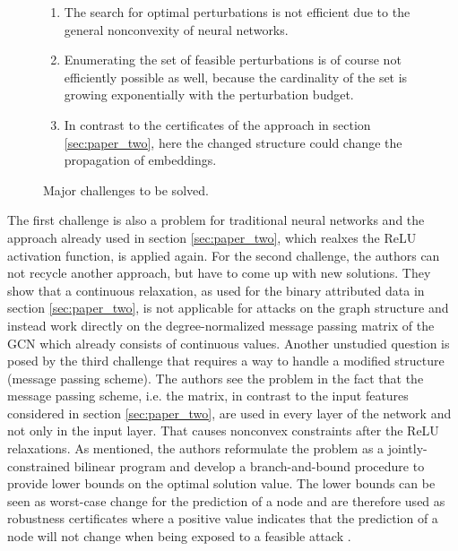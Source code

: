 \documentclass[a4paper,preprint]{sig-alternate}
\begin{document}
\begin{figure}[h]
    \centering
    \begin{enumerate}
        \item The search for optimal perturbations is not efficient due to the general nonconvexity of neural networks.
        \item Enumerating the set of feasible perturbations is of course not efficiently possible as well, because the cardinality of the
        set is growing exponentially with the perturbation budget.
        \item In contrast to the certificates of the approach in section \ref{sec:paper_two}, here the changed structure could change 
        the propagation of embeddings.
    \end{enumerate}
    \caption{Major challenges to be solved.}
    \label{fig:challenges}
\end{figure}

The first challenge is also a problem for traditional neural networks and the approach already used
in section \ref{sec:paper_two}, which realxes the ReLU activation function, is applied again. \cite{10.1145/3394486.3403217}
For the second challenge, the authors can not recycle another approach, but have to come up with new solutions.
They show that a continuous relaxation, as used for the binary attributed data in section \ref{sec:paper_two}, 
is not applicable for attacks on the graph structure and instead work directly on the degree-normalized message passing matrix 
of the GCN which already consists of continuous values.
Another unstudied question is posed by the third challenge that requires a way to handle a modified structure (message passing scheme). \cite{10.1145/3394486.3403217}
The authors see the problem in the fact that the message passing scheme, i.e. the matrix, in contrast to the input features considered
in section \ref{sec:paper_two}, are used in every layer of the network and not only in the input layer.
That causes nonconvex constraints after the ReLU relaxations. \cite{10.1145/3394486.3403217}
As mentioned, the authors reformulate the problem as a jointly-constrained bilinear program and develop a branch-and-bound procedure 
to provide lower bounds on the optimal solution value.
The lower bounds can be seen as worst-case change for the prediction of a node and are therefore used as 
robustness certificates where a positive value indicates that the prediction of a node will not
change when being exposed to a feasible attack . \cite{10.1145/3394486.3403217}
\end{document}
